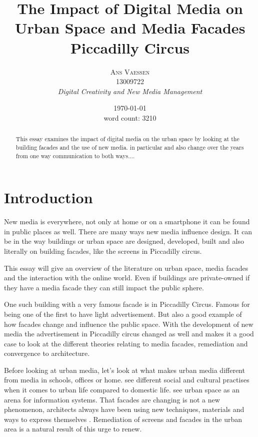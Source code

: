 \documentclass[a4paper, 11pt]{article}
\title{\textbf{The Impact of Digital Media on Urban Space and Media Facades}\\Piccadilly Circus}
\author{\textsc{Ans Vaessen}
\\13009722
\\{\textit{Digital Creativity and New Media Management}}}
\date{\today\\
word count: 3210}
\begin{document}
\maketitle

\begin{abstract}
This essay examines the impact of digital media on the urban space by looking at the building facades and the use of new media. 
in particular 
and also 
change over the years from one way  communication to both ways....

\end{abstract}

\vspace{30pt} %

\section*{Introduction}



New media is everywhere, not only at home or on a smartphone it can be found in public places as well. There are many ways new media influence design. It can be in the way buildings or urban space are designed, developed, built and also literally on building facades, like the screens in Piccadilly circus.

This essay will give an overview of the literature on urban space, media facades and the interaction with the online world. Even if buildings are private-owned if they have a media facade they can still impact the public sphere.

One such building with a very famous facade is in Piccadilly Circus. Famous for being one of the first to have light advertisement. But also a good example of how facades change and influence the public space. With the development of new media the advertisement in Piccadilly circus changed as well and makes it a good case to look at the different theories relating to media facades, remediation and convergence to architecture.

Before looking at urban media, let's look at what makes urban media different from media in schools, offices or home. \cite{fritsch2008a} see different social and cultural practises when it comes to urban life compared to domestic life. \cite{Daalsgaard2010} see urban space as an arena for information systems.
That facades are changing is not a new phenomenon, architects always have been using new techniques, materials and ways to express themselves \citep{fritsch2008a}. Remediation of screens and facades in the urban area is a natural result of this urge to renew. 
\end{document}

